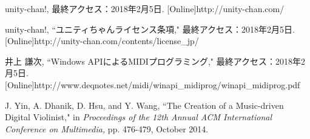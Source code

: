\begin{thebibliography}{55}
unity-chan!, 最終アクセス：2018年2月5日.
 [Online]http://unity-chan.com/
 
unity-chan!, ``ユニティちゃんライセンス条項," 最終アクセス：2018年2月5日.
 [Online]http://unity-chan.com/contents/license\_jp/

井上 謙次, ``Windows APIによるMIDIプログラミング," 最終アクセス：2018年2月5日. 
 [Online]http://www.deqnotes.net/midi/winapi\_midiprog/winapi\_midiprog.pdf
 

J. Yin, A. Dhanik, D. Hsu, and Y. Wang,
 ``The Creation of a Music-driven Digital Violinist,"
 in \textit{Proceedings of the 12th Annual ACM International Conference on Multimedia,} pp. 476-479, October 2014.
 
\end{thebibliography}